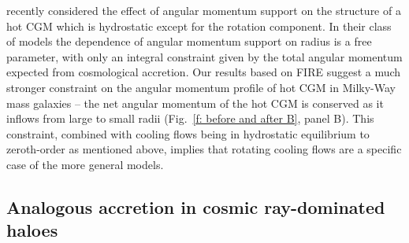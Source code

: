 \documentclass[fleqn,usenatbib]{mnras}
\begin{document}

\cite{Sormani2018} recently considered the effect of angular momentum support on the structure of a hot CGM which is hydrostatic except for the rotation component.
In their class of models the dependence of angular momentum support on radius is a free parameter, with only an integral constraint given by the total angular momentum expected from  cosmological accretion.
Our results based on FIRE suggest a much stronger constraint on the angular momentum profile of hot CGM in Milky-Way mass galaxies -- the net angular momentum of the hot CGM is conserved as it inflows from large to small radii (Fig.~\ref{f: before and after B}, panel B). 
This constraint, combined with cooling flows being in hydrostatic equilibrium to zeroth-order as mentioned above, implies that rotating cooling flows are a specific case of the more general \cite{Sormani2018} models. 



\subsection{Analogous accretion in cosmic ray-dominated haloes}
\label{s: crs}
\end{document}
